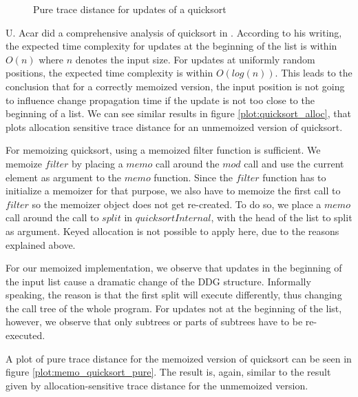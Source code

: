 \begin{figure}
\centering
{}
\caption{Pure trace distance for updates of a quicksort}
\label{plot:quicksort_pure}
\end{figure}

U. Acar did a comprehensive analysis of quicksort in \cite{Acar2005thesis}. According to his writing, the expected time complexity for updates at the beginning of the list is within $O(n)$ where $n$ denotes the input size. For updates at uniformly random positions, the expected time complexity is within $O(log(n))$. This leads to the conclusion that for a correctly memoized version, the input position is not going to influence change propagation time if the update is not too close to the beginning of a list. We can see similar results in figure \ref{plot:quicksort_alloc}, that plots allocation sensitive trace distance for an unmemoized version of quicksort. 

For memoizing quicksort, using a memoized filter function is sufficient. We memoize $filter$ by placing a $memo$ call around the $mod$ call and use the current element as argument to the $memo$ function. Since the $filter$ function has to initialize a memoizer for that purpose, we also have to memoize the first call to $filter$ so the memoizer object does not get re-created. To do so, we place a $memo$ call around the call to $split$ in $quicksortInternal$, with the head of the list to split as argument. Keyed allocation is not possible to apply here, due to the reasons explained above. 

For our memoized implementation, we observe that updates in the beginning of the input list cause a dramatic change of the DDG structure. Informally speaking, the reason is that the first split will execute differently, thus changing the call tree of the whole program. For updates not at the beginning of the list, however, we observe that only subtrees or parts of subtrees have to be re-executed. 

A plot of pure trace distance for the memoized version of quicksort can be seen in figure \ref{plot:memo_quicksort_pure}. The result is, again, similar to the result given by allocation-sensitive trace distance for the unmemoized version. 

